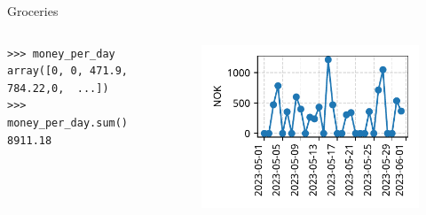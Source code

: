 \documentclass[12pt, aspectratio=149]{beamer}
\theoremstyle{plain}
\begin{document}
\begin{frame}[fragile]{Groceries}
\begin{columns}
\begin{column}{0.50\textwidth}
    \begin{center}
     \begin{verbatim} 
>>> money_per_day
array([0, 0, 471.9, 784.22,0,  ...])
>>> money_per_day.sum()
8911.18
     \end{verbatim}
     \end{center}	
\end{column}
\begin{column}{0.50\textwidth}  %
    \begin{center}
     \begin{figure}
     	\centering
     	\includegraphics[width=0.99\linewidth]{figures/groceries_data}
     \end{figure}
     \end{center}
\end{column}
\end{columns}
\end{frame}
\end{document}
